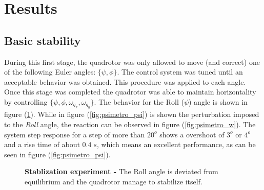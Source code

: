\documentclass[conference]{IEEEtran}
\newcommand{\refp}[1]{(\ref{#1})}
\begin{document}
\section{Results}
\label{sec:results-tests}

\subsection{Basic stability}

During this first stage, the quadrotor was only allowed to move (and correct) one of the following Euler angles: $\{\psi,\phi\}$. The control system was tuned until an acceptable behavior was obtained. This procedure was applied to each angle. Once this stage was completed the quadrotor was able to maintain horizontality by controlling $\{\psi,\phi,\omega_{q_x},\omega_{q_y}\}$. The behavior for the Roll ($\psi$) angle is shown in figure \refp{fig:psimetro}. While in figure \refp{fig:psimetro_psi} is shown the perturbation imposed to the \emph{Roll} angle, the reaction can be observed in figure \refp{fig:psimetro_w}. The system step response for a step of more than $20^o$ shows a overshoot of $3^o$ or $4^o$ and a rise time of about $0.4\;s$, which means an excellent performance, as can be seen in figure \refp{fig:psimetro_psi}.
\begin{figure}[h!]
  \centering
   \hspace*{-5pt}
  \caption{\textbf{Stablization experiment -} The Roll angle is deviated from equilibrium and the quadrotor manage to stabilize itself.}
  \label{fig:psimetro}
\end{figure}
\end{document}
